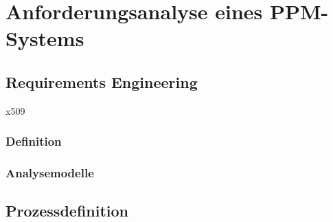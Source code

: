 \chapter{Anforderungsanalyse eines PPM-Systems}
%
\label{chp:Anforderungsanalyse}%



\section{Requirements Engineering}
%
\label{sec:anf:req}%
\gls{x509}\cite{xml-dsig:w3c}


\subsection{Definition}
\label{sec:anf:req:definition}%

\subsection{Analysemodelle}
\label{sec:anf:req:modelle}%



\section{Prozessdefinition}
%
\label{sec:anf:process}%
